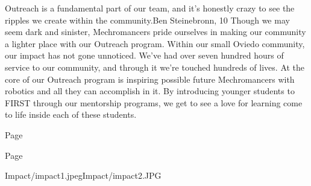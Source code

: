 {Outreach is a fundamental part of our team, and it's honestly crazy to see the ripples we create within the community.}{Ben Steinebronn, 10}
{Though we may seem dark and sinister, Mechromancers pride ourselves in making our community a lighter place with our Outreach program. Within our small Oviedo community, our impact has not gone unnoticed. We’ve had over seven hundred hours of service to our community, and through it we’re touched hundreds of lives. At the core of our Outreach program is inspiring possible future Mechromancers with robotics and all they can accomplish in it. By introducing younger students to FIRST through our mentorship programs, we get to see a love for learning come to life inside each of these students. }
{
\item[$\blacksquare$] Page \pageref{Impact:1}
\item[$\blacksquare$] Page \pageref{Impact:2}
}
{Impact/impact1.jpeg}{Impact/impact2.JPG}